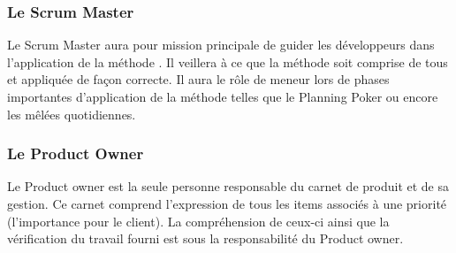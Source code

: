 \subsubsection{Le Scrum Master}
Le Scrum Master aura pour mission principale de guider les développeurs dans l’application
de la méthode \Scrum. Il veillera à ce que la méthode soit comprise de tous et appliquée de façon
correcte. Il aura le rôle de meneur lors de phases importantes d’application de la méthode telles
que le Planning Poker ou encore les mêlées quotidiennes.

\subsubsection{Le Product Owner}
Le Product owner est la seule personne responsable du carnet de produit et de sa gestion. Ce
carnet comprend l’expression de tous les items associés à une priorité (l’importance pour le client).
La compréhension de ceux-ci ainsi que la vérification du travail fourni est sous la responsabilité du
Product owner.